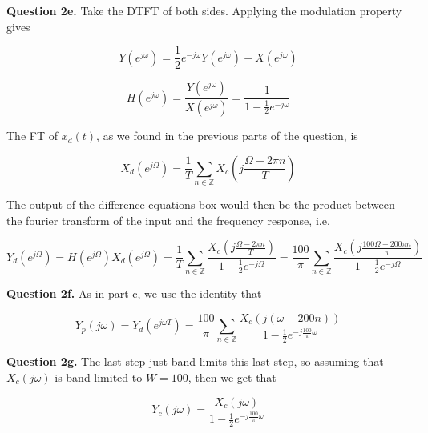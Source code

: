 \documentclass[letterpaper, reqno,11pt]{article}
\newcommand{\ZZ}{\mathbb{Z}}
\begin{document}
{\noindent\bf Question 2e.} Take the DTFT of both sides. Applying the modulation property gives 

\[
    Y(e^{j\omega})=\frac12 e^{-j\omega} Y(e^{j\omega})+X(e^{j\omega})
\]

\[
    H(e^{j\omega}) = \frac{Y(e^{j\omega})}{X(e^{j\omega})}=\frac1{1-\frac12e^{-j\omega}}
\]

The FT of $x_d(t)$, as we found in the previous parts of the question, is 

\[
    X_d(e^{j\Omega}) = \frac1T \sum_{n\in\ZZ}X_c(j\frac{\Omega-2\pi n}T)
\]

The output of the difference equations box would then be the product between the fourier transform of the input and the frequency response, i.e.

\[
    Y_d(e^{j\Omega})=H(e^{j\Omega})X_d(e^{j\Omega})=\frac1T\sum_{n\in\ZZ}\frac{X_c(j\frac{\Omega-2\pi n} T)}{1-\frac12e^{-j\Omega}}=\frac{100}\pi\sum_{n\in\ZZ}\frac{X_c(j\frac{100\Omega-200\pi n} \pi)}{1-\frac12e^{-j\Omega}}
\]

{\noindent\bf Question 2f.} As in part c, we use the identity that 

\[
    Y_p(j\omega)=Y_d(e^{j\omega T})=\frac{100}\pi\sum_{n\in\ZZ}\frac{X_c(j(\omega-200 n))}{1-\frac12e^{-j\frac{100}\pi\omega}}
\]

{\noindent\bf Question 2g.} The last step just band limits this last step, so assuming that $X_c(j\omega)$ is band limited to $W=100$, then we get that 

\[
    Y_c(j\omega) = \frac{X_c(j\omega)}{1-\frac12 e^{-j\frac{100}\pi\omega}}    
\]
\end{document}

